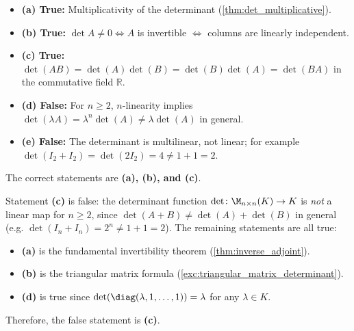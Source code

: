\begin{exercisesolution*}
\label{sol:general_determinant_properties_mc}
\begin{itemize}
    \item \textbf{(a) True:} Multiplicativity of the determinant (\cref{thm:det_multiplicative}).
    \item \textbf{(b) True:} $\det A \ne 0 \iff A$ is invertible $\iff$ columns are linearly independent.
    \item \textbf{(c) True:} $\det(AB) = \det(A)\det(B) = \det(B)\det(A) = \det(BA)$ in the commutative field $\mathbb{R}$.
    \item \textbf{(d) False:} For $n \ge 2$, $n$-linearity implies $\det(\lambda A) = \lambda^n \det(A) \ne \lambda \det(A)$ in general.
    \item \textbf{(e) False:} The determinant is multilinear, not linear; for example $\det(I_2 + I_2) = \det(2I_2) = 4 \ne 1 + 1 = 2$.
\end{itemize}
The correct statements are \textbf{(a), (b), and (c)}.
\end{exercisesolution*}

\begin{exercisesolution*}
\label{sol:determinant_properties_linearity_sc}
Statement \textbf{(c)} is false: the determinant function $\det \colon \M_{n \times n}(K) \to K$ is \emph{not} a linear map for $n \ge 2$, since $\det(A + B) \ne \det(A) + \det(B)$ in general (e.g. $\det(I_n + I_n) = 2^n \ne 1 + 1 = 2$).
The remaining statements are all true:
\begin{itemize}
    \item \textbf{(a)} is the fundamental invertibility theorem (\cref{thm:inverse_adjoint}).
    \item \textbf{(b)} is the triangular matrix formula (\cref{exc:triangular_matrix_determinant}).
    \item \textbf{(d)} is true since $\det(\diag(\lambda, 1, \dots, 1)) = \lambda$ for any $\lambda \in K$.
\end{itemize}
Therefore, the false statement is \textbf{(c)}.
\end{exercisesolution*}

